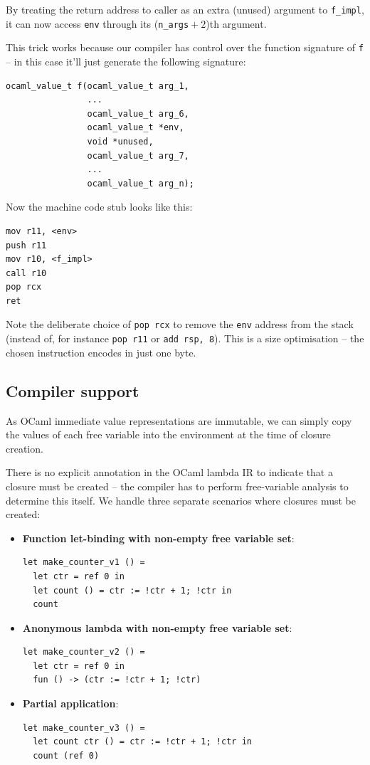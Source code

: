 \documentclass[12pt,a4paper,twoside,openright]{report}
\begin{document}
By treating the return address to caller as an extra (unused) argument to
\lstinline!f_impl!, it can now access \lstinline!env! through its
(\lstinline{n_args}${}+2$)th argument.

This trick works because our compiler has control over the function signature
of \lstinline{f} -- in this case it'll just generate the following signature:

\begin{lstlisting}
ocaml_value_t f(ocaml_value_t arg_1,
                ...
                ocaml_value_t arg_6,
                ocaml_value_t *env,
                void *unused,
                ocaml_value_t arg_7,
                ...
                ocaml_value_t arg_n);
\end{lstlisting}

Now the machine code stub looks like this:

\begin{lstlisting}
mov r11, <env>
push r11
mov r10, <f_impl>
call r10
pop rcx
ret
\end{lstlisting}

Note the deliberate choice of \lstinline{pop rcx} to remove the
\lstinline{env} address from the stack (instead of, for instance
\lstinline{pop r11} or \lstinline{add rsp, 8}). This is a size optimisation --
the chosen instruction encodes in just one byte.

\subsection{Compiler support}\label{closures-compiler-support}

As OCaml immediate value representations are immutable, we can simply copy the
values of each free variable into the environment at the time of closure
creation.

There is no explicit annotation in the OCaml lambda IR to indicate that a
closure must be created -- the compiler has to perform free-variable analysis
to determine this itself. We handle three separate scenarios where closures
must be created:

\begin{itemize}
    \item \textbf{Function let-binding with non-empty free variable set}:
      \begin{lstlisting}
let make_counter_v1 () =
  let ctr = ref 0 in
  let count () = ctr := !ctr + 1; !ctr in
  count
      \end{lstlisting}
    \item \textbf{Anonymous lambda with non-empty free variable set}:
      \begin{lstlisting}
let make_counter_v2 () =
  let ctr = ref 0 in
  fun () -> (ctr := !ctr + 1; !ctr)
      \end{lstlisting}
    \item \textbf{Partial application}:
      \begin{lstlisting}
let make_counter_v3 () =
  let count ctr () = ctr := !ctr + 1; !ctr in
  count (ref 0)
      \end{lstlisting}
\end{itemize}
\end{document}
